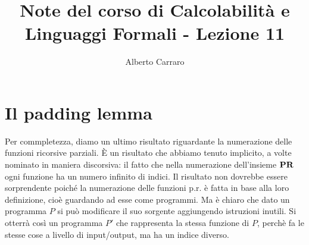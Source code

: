 \documentclass[runningheads,a4paper]{llncs}
\begin{document}
\mainmatter  %

\title{Note del corso di Calcolabilit\`{a} e Linguaggi Formali - Lezione 11}


%
%
\author{Alberto Carraro}
%


%
%




\maketitle

\section{Il padding lemma}

Per commpletezza, diamo un ultimo risultato riguardante la numerazione delle funzioni ricorsive parziali. \`{E} un risultato che abbiamo
 tenuto implicito, a volte nominato in maniera discorsiva: il fatto che nella numerazione dell'insieme $\mathbf{PR}$ ogni funzione ha
 un numero infinito di indici. Il risultato non dovrebbe essere sorprendente poich\'{e} la numerazione delle funzioni p.r. \`{e}
 fatta in base alla loro definizione, cio\`{e} guardando ad esse come programmi. Ma \`{e} chiaro che dato un programma $P$
 si pu\`{o} modificare il suo sorgente aggiungendo istruzioni inutili. Si otterr\`{a} cos\`{i} un programma $P'$ che rappresenta la 
 stessa funzione di $P$, perch\`{e} fa le stesse cose a livello di input/output, ma ha un indice diverso.
\end{document}
